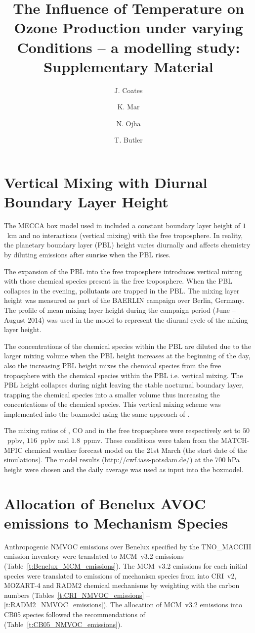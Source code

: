 \documentclass[11pt,a4paper]{article}
\title{The Influence of Temperature on Ozone Production under varying \ce{NO_x} Conditions -- a modelling study: Supplementary Material}
\author[1]{J. Coates}
\author[1]{K. Mar}
\author[2]{N. Ojha}
\author[1]{T. Butler}
\affil[1]{Institute for Advanced Sustainability Studies, Potsdam, Germany}
\affil[2]{Max Planck Institute for Chemistry, Mainz, Germany}
\begin{document}
\maketitle

\section{Vertical Mixing with Diurnal Boundary Layer Height} 
The MECCA box model used in \citet{Coates:2015} included a constant boundary layer height of $1$~km and no interactions (vertical mixing) with the free troposphere.
In reality, the planetary boundary layer (PBL) height varies diurnally and affects chemistry by diluting emissions after sunrise when the PBL rises. 

The expansion of the PBL into the free troposphere introduces vertical mixing with those chemical species present in the free troposphere. 
When the PBL collapses in the evening, pollutants are trapped in the PBL.  
The mixing layer height was measured as part of the BAERLIN campaign \citep{Bonn:2016} over Berlin, Germany. 
The profile of mean mixing layer height during the campaign period (June -- August 2014) was used in the model to represent the diurnal cycle of the mixing layer height.

The concentrations of the chemical species within the PBL are diluted due to the larger mixing volume when the PBL height increases at the beginning of the day, also the increasing PBL height mixes the chemical species from the free troposphere with the chemical species within the PBL i.e. vertical mixing. 
The PBL height collapses during night leaving the stable nocturnal boundary layer, trapping the chemical species into a smaller volume thus increasing the concentrations of the chemical species.
This vertical mixing scheme was implemented into the boxmodel using the same approach of \citet{Lourens:2016}.

The mixing ratios of , CO and  in the free troposphere were respectively set to $50$~ppbv, $116$~ppbv and $1.8$~ppmv. 
These conditions were taken from the MATCH-MPIC chemical weather forecast model on the 21st March (the start date of the simulations). 
The model results (\url{http://cwf.iass-potsdam.de/}) at the 700 hPa height were chosen and the daily average was used as input into the boxmodel.

\section{Allocation of Benelux AVOC emissions to Mechanism Species}
Anthropogenic NMVOC emissions over Benelux specified by the TNO\_MACCIII emission inventory \citep{Kuenen:2014} were translated to MCM~v3.2 emissions (Table~\ref{t:Benelux_MCM_emissions}).
The MCM~v3.2 emissions for each initial species were translated to emissions of mechanism species from into CRI~v2, MOZART-4 and RADM2 chemical mechanisms by weighting with the carbon numbers (Tables~\ref{t:CRI_NMVOC_emissions} -- \ref{t:RADM2_NMVOC_emissions}).
The allocation of MCM~v3.2 emissions into CB05 species followed the recommendations of \citet{Yarwood:2005} (Table~\ref{t:CB05_NMVOC_emissions}).
\end{document}

